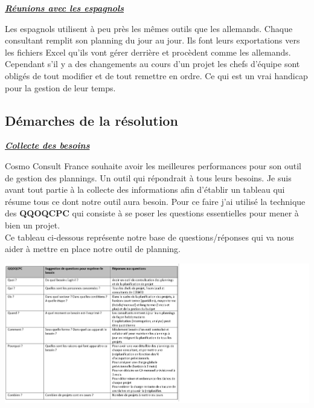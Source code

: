 \documentclass[11pt]{report}
\begin{document}
\quad

\hspace{1cm} \underline{\textbf{\textit{Réunions avec les espagnols}}}
\quad

\hspace{1cm} Les espagnols utilisent à peu près les mêmes outils que les allemands. Chaque consultant remplit son planning du jour au jour. Ils font leurs exportations vers les fichiers Excel qu’ils vont gérer derrière et procèdent comme les allemands.  Cependant s’il y a des changements au cours d’un projet les chefs d’équipe sont obligés de tout modifier et de tout remettre en ordre. Ce qui est un vrai handicap pour la gestion de leur temps. 

	\subsection{Démarches de la résolution}
\hspace{1cm} \underline{\textbf{\textit{Collecte des besoins}}}
\quad

\hspace{1cm} Cosmo Consult France souhaite avoir les meilleures performances pour son outil de gestion des plannings. Un outil qui répondrait à tous leurs besoins. Je suis avant tout partie à la collecte des informations afin d’établir un tableau qui résume tous ce dont notre outil aura besoin. Pour ce faire j’ai utilisé la technique des \textbf{QQOQCPC} qui consiste à se poser les questions essentielles pour mener à bien un projet.\\

Ce tableau ci-dessous représente notre base de questions/réponses qui va nous aider à mettre en place notre outil de planning.

\begin{center}
\includegraphics[scale=0.9]{images/tab3.png}
\end{center}
\end{document}
